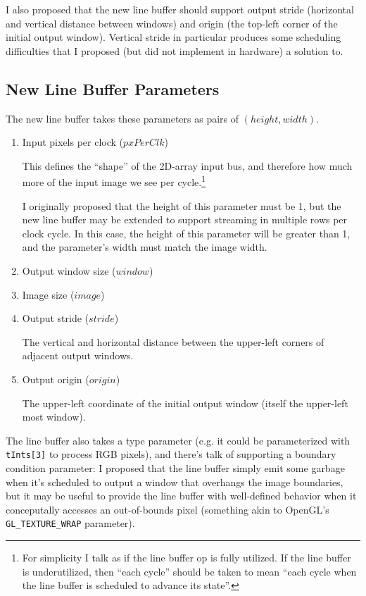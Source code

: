 \documentclass[12pt]{article}
\begin{document}
I also proposed that the new line buffer should support output stride
(horizontal and vertical distance between windows) and origin (the
top-left corner of the initial output window). Vertical stride in
particular produces some scheduling difficulties that I proposed
(but did not implement in hardware) a solution to.

\subsection{New Line Buffer Parameters}

The new line buffer takes these parameters as pairs of $(height, width)$.

\begin{enumerate}
\item Input pixels per clock ($pxPerClk$)

This defines the ``shape'' of the 2D-array
input bus, and therefore how much more of the input image we see per
cycle.\footnote{For simplicity I talk as if the line buffer op is
fully utilized. If the line buffer is underutilized, then ``each cycle''
should be taken to mean ``each cycle when the line buffer is scheduled
to advance its state''.}

I originally proposed that the height of this parameter must be 1, but
the new line buffer may be extended to support streaming in multiple
rows per clock cycle. In this case, the height of this parameter
will be greater than 1, and the parameter's width must match the
image width.

\item Output window size ($window$)

\item Image size ($image$)

\item Output stride ($stride$)

The vertical and horizontal distance between the
upper-left corners of adjacent output windows.

\item Output origin ($origin$)

The upper-left coordinate of the initial output
window (itself the upper-left most window).
\end{enumerate}

The line buffer also takes a type parameter (e.g. it could be
parameterized with \texttt{tInts[3]} to process RGB pixels), and
there's talk of supporting a boundary condition parameter: I proposed
that the line buffer simply emit some garbage when it's scheduled to
output a window that overhangs the image boundaries, but it may be
useful to provide the line buffer with well-defined behavior when it
conceputally accesses an out-of-bounds pixel (something akin to
OpenGL's \texttt{GL\_TEXTURE\_WRAP} parameter).
\end{document}
